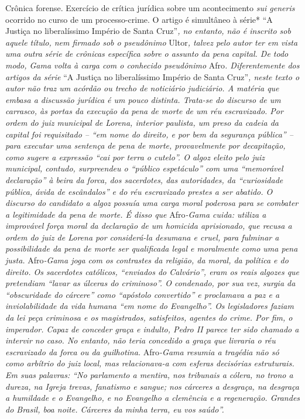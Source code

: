 \begin{didascalia}
Crônica forense. Exercício de crítica jurídica sobre um
acontecimento\emph{ sui generis }ocorrido no curso de um processo-crime.
O artigo é simultâneo à série* ``A Justiça no liberalíssimo Império de
Santa Cruz''\emph{, no entanto, não é inscrito sob aquele título, nem
firmado sob o pseudônimo} Ultor\emph{, talvez pelo autor ter em vista
uma outra série de crônicas específica sobre o assunto da pena capital.
De todo modo, Gama volta à carga com o conhecido pseudônimo} Afro\emph{.
Diferentemente dos artigos da série} ``A Justiça no liberalíssimo Império
de Santa Cruz''\emph{, neste texto o autor não traz um acórdão ou trecho
de noticiário judiciário. A matéria que embasa a discussão jurídica é um
pouco distinta. Trata-se do discurso de um carrasco, às portas da
execução da pena de morte de um réu escravizado. Por ordem do juiz
municipal de Lorena, interior paulista, um preso da cadeia da capital
foi requisitado -- ``em nome do direito, e por bem da segurança pública''
-- para executar uma sentença de pena de morte, provavelmente por
decapitação, como sugere a expressão ``cai por terra o cutelo''. O algoz
eleito pelo juiz municipal, contudo, surpreendeu o ``público espetáculo''
com uma ``memorável declaração'' à beira da forca, dos sacerdotes, das
autoridades, da ``curiosidade pública, ávida de escândalos'' e do réu
escravizado prestes a ser abatido. O discurso do candidato a algoz
possuía uma carga moral poderosa para se combater a legitimidade da pena
de morte. É disso que} Afro\emph{-Gama cuida: utiliza a improvável força
moral da declaração de um homicida aprisionado, que recusa a ordem do
juiz de Lorena por considerá-la desumana e cruel, para fulminar a
possibilidade da pena de morte ser qualificada legal e moralmente como
uma pena justa.} Afro\emph{-Gama joga com os contrastes da religião, da
moral, da política e do direito. Os sacerdotes católicos, ``enviados do
Calvário'', eram os reais algozes que pretendiam ``lavar as úlceras do
criminoso''. O condenado, por sua vez, surgia da ``obscuridade do cárcere''
como ``apóstolo convertido'' e proclamava a paz e a inviolabilidade da
vida humana ``em nome do Evangelho''. Os legisladores faziam da lei peça
criminosa e os magistrados, satisfeitos, agentes do crime. Por fim, o
imperador. Capaz de conceder graça e indulto, Pedro II parece ter sido
chamado a intervir no caso. No entanto, não teria concedido a graça que
livraria o réu escravizado da forca ou da guilhotina.} Afro\emph{-Gama
resumia a tragédia não só como arbítrio do juiz local, mas relacionava-a
com esferas decisórias estruturais. Em suas palavras: ``No parlamento a
mentira, nos tribunais a cólera, no trono a dureza, na Igreja trevas,
fanatismo e sangue; nos cárceres a desgraça, na desgraça a humildade e o
Evangelho, e no Evangelho a clemência e a regeneração. Grandes do
Brasil, boa noite. Cárceres da minha terra, eu vos saúdo''.}
\end{didascalia}


